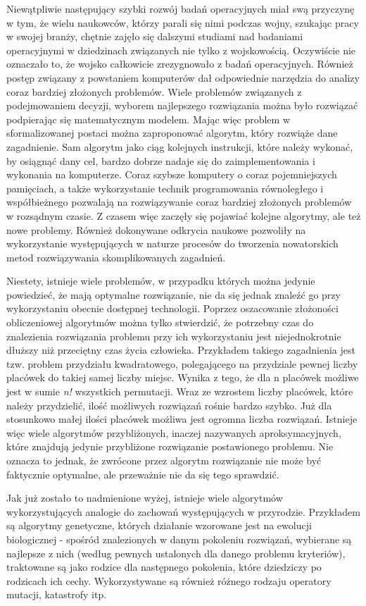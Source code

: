 Niewątpliwie następujący szybki rozwój badań operacyjnych miał swą przyczynę  w tym, że wielu naukowców, którzy parali się nimi podczas wojny, szukając pracy w swojej branży, chętnie zajęło się dalszymi studiami nad badaniami operacyjnymi w dziedzinach związanych nie tylko z wojskowością. Oczywiście nie oznaczało to, że wojsko całkowicie zrezygnowało z badań operacyjnych. Również postęp związany z powstaniem komputerów dał odpowiednie narzędzia do analizy coraz bardziej złożonych problemów. Wiele problemów związanych z podejmowaniem decyzji, wyborem najlepszego rozwiązania można było rozwiązać podpierając się matematycznym modelem. Mając więc problem w sformalizowanej postaci można zaproponować algorytm, który rozwiąże dane zagadnienie. Sam algorytm jako ciąg kolejnych instrukcji, które należy wykonać, by osiągnąć dany cel, bardzo dobrze nadaje się do zaimplementowania i wykonania na komputerze. Coraz szybsze komputery o coraz pojemniejszych pamięciach, a także wykorzystanie technik programowania równoległego i współbieżnego pozwalają na rozwiązywanie coraz bardziej złożonych problemów w rozsądnym czasie. Z czasem więc zaczęły się pojawiać kolejne algorytmy, ale też nowe problemy. Również dokonywane odkrycia naukowe pozwoliły na wykorzystanie występujących w naturze procesów do tworzenia nowatorskich metod rozwiązywania skomplikowanych zagadnień.

Niestety, istnieje wiele problemów, w przypadku których można jedynie powiedzieć, że mają optymalne rozwiązanie, nie da się jednak znaleźć go przy wykorzystaniu obecnie dostępnej technologii. Poprzez oszacowanie złożoności obliczeniowej algorytmów można tylko stwierdzić, że potrzebny czas do znalezienia rozwiązania problemu przy ich wykorzystaniu jest niejednokrotnie dłuższy niż przeciętny czas życia człowieka. Przykładem takiego zagadnienia jest tzw. problem przydziału kwadratowego, polegającego na przydziale pewnej liczby placówek do takiej samej liczby miejsc. Wynika z tego, że dla n placówek możliwe jest w sumie \textit{n!} wszystkich permutacji. Wraz ze wzrostem liczby placówek, które należy przydzielić, ilość możliwych rozwiązań rośnie bardzo szybko. Już dla stosunkowo małej ilości placówek możliwa jest ogromna liczba rozwiązań. Istnieje  więc wiele algorytmów przybliżonych, inaczej nazywanych aproksymacyjnych, które znajdują jedynie przybliżone rozwiązanie postawionego problemu. Nie oznacza to jednak, że zwrócone przez algorytm rozwiązanie nie może być faktycznie optymalne, ale przeważnie nie da się tego sprawdzić.

Jak już zostało to nadmienione wyżej, istnieje wiele algorytmów wykorzystujących analogie do zachowań występujących w przyrodzie. Przykładem są algorytmy genetyczne, których działanie wzorowane jest na ewolucji biologicznej - spośród znalezionych w danym pokoleniu rozwiązań, wybierane są najlepsze z nich (według pewnych ustalonych dla danego problemu kryteriów), traktowane są jako rodzice dla następnego pokolenia, które dziedziczy po rodzicach ich cechy. Wykorzystywane są również różnego rodzaju operatory mutacji, katastrofy itp. 


